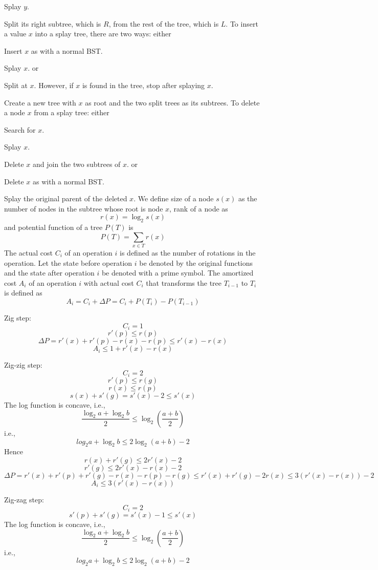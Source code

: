 \documentclass[a4paper,12pt]{article}
\begin{document}
\item Splay $y$.
\item Split its right subtree, which is $R$, from the rest of the tree, which is $L$.
\een
{}
To insert a value $x$ into a splay tree, there are two ways: either
\ben
\item Insert $x$ as with a normal BST.
\item Splay $x$.
\een
or
\ben
\item Split at $x$. However, if $x$ is found in the tree, stop after splaying $x$.
\item Create a new tree with $x$ as root and the two split trees as its subtrees.
\een
{}
To delete a node $x$ from a splay tree: either
\ben
\item Search for $x$.
\item Splay $x$.
\item Delete $x$ and join the two subtrees of $x$.
\een
or
\ben
\item Delete $x$ as with a normal BST.
\item Splay the original parent of the deleted $x$.
\een
{}
We define size of a node $s(x)$ as the number of nodes in the subtree whose root is node $x$, rank of a node as
\[r(x)=\log_2s(x)\]
and potential function of a tree $P(T)$ is
\[P(T)=\sum_{x\in T}r(x)\]
The actual cost $C_i$ of an operation $i$ is defined as the number of rotations in the operation. Let the state before operation $i$ be denoted by the original functions and the state after operation $i$ be denoted with a prime symbol. The amortized cost $A_i$ of an operation $i$ with actual cost $C_i$ that transforms the tree $T_{i-1}$ to $T_i$ is defined as
\[A_i=C_i+\Delta P=C_i+P(T_i)-P(T_{i-1})\]
\bit
\item Zig step:
\[C_i=1\]
\[r'(p)\le r(p)\]
\[\Delta P=r'(x)+r'(p)-r(x)-r(p)\le r'(x)-r(x)\]
\[A_i\le 1+r'(x)-r(x)\]
\item Zig-zig step:
\[C_i=2\]
\[r'(p)\le r(g)\]
\[r(x)\le r(p)\]
\[s(x)+s'(g)=s'(x)-2\le s'(x)\]
The log function is concave, i.e.,
\[\frac{\log_2a+\log_2b}{2}\le\log_2(\frac{a+b}{2})\]
i.e.,
\[log_2a+\log_2b\le 2\log_2(a+b)-2\]
Hence
\[r(x)+r'(g)\le 2r'(x)-2\]
\[r'(g)\le 2r'(x)-r(x)-2\]
\[\Delta P=r'(x)+r'(p)+r'(g)-r(x)-r(p)-r(g)\le r'(x)+r'(g)-2r(x)\le 3(r'(x)-r(x))-2\]
\[A_i\le 3(r'(x)-r(x))\]
\item Zig-zag step:
\[C_i=2\]
\[s'(p)+s'(g)=s'(x)-1\le s'(x)\]
The log function is concave, i.e.,
\[\frac{\log_2a+\log_2b}{2}\le\log_2(\frac{a+b}{2})\]
i.e.,
\[log_2a+\log_2b\le 2\log_2(a+b)-2\]
\end{document}
